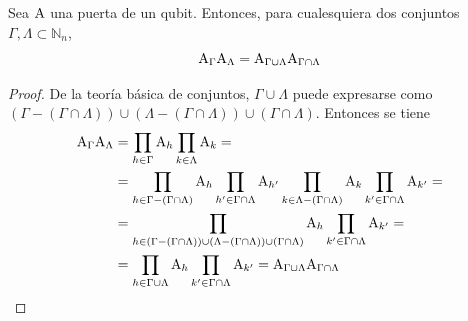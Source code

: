 	\begin{proposition}
		Sea $\text{A}$ una puerta de un qubit.
		Entonces, para cualesquiera dos conjuntos $\Gamma, \Lambda \subset \mathbb{N}_n$,
		\begin{equation}
			\label{eq:junta-puertas}
			\text{A}_\Gamma\text{A}_{\Lambda} = \text{A}_{\Gamma\cup\Lambda}\text{A}_{\Gamma\cap\Lambda}
		\end{equation}

	\end{proposition}
	\begin{proof}
		De la teoría básica de conjuntos, $\Gamma\cup\Lambda$ puede expresarse como $(\Gamma-(\Gamma\cap\Lambda))\cup(\Lambda-(\Gamma\cap\Lambda))\cup(\Gamma\cap\Lambda)$. Entonces se tiene
		\begin{align*}
			\text{A}_{\Gamma}\text{A}_{\Lambda}&=\prod_{h\in\Gamma}\text{A}_{h}\prod_{k\in\Lambda}\text{A}_{k}=\\
			&=\prod_{h\in\Gamma-(\Gamma\cap\Lambda)}\text{A}_{h}\prod_{h^\prime\in\Gamma\cap\Lambda}\text{A}_{h^\prime}\prod_{k\in\Lambda-(\Gamma\cap\Lambda)}\text{A}_{k}\prod_{k^\prime\in\Gamma\cap\Lambda}\text{A}_{k^\prime}=\\
			&=\prod_{h\in(\Gamma-(\Gamma\cap\Lambda))\cup(\Lambda-(\Gamma\cap\Lambda))\cup(\Gamma\cap\Lambda)}\text{A}_{h}\prod_{k^\prime\in\Gamma\cap\Lambda}\text{A}_{k^\prime}=\\
			&=\prod_{h\in\Gamma\cup\Lambda}\text{A}_{h}\prod_{k^\prime\in\Gamma\cap\Lambda}\text{A}_{k^\prime}=\text{A}_{\Gamma\cup\Lambda}\text{A}_{\Gamma\cap\Lambda}
		\end{align*}
	\end{proof}

